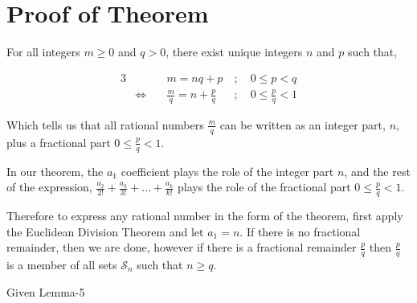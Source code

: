 \documentclass{article}
\begin{document}
\section*{Proof of Theorem}

For all integers \(m\ge{}0\) and \(q>0\),
there exist unique integers \(n\) and \(p\) such that,

{\normalsize
\bgroup                                  %
\setlength{\abovedisplayskip}{0pt}       %
\begin{alignat*}{3}
&&m = nq + p\ &;\quad 0\le{}p<q \\
&\Leftrightarrow\quad &\frac{m}{q} = n + \frac{p}{q}\ &;\quad 0\le{}\frac{p}{q}<1
\end{alignat*}
\egroup
}

Which tells us that all rational numbers \(\frac{m}{q}\) can be written as
an integer part, \(n\), plus a fractional part \(0\le{}\frac{p}{q}<1\).

In our theorem, the \(a_1\) coefficient plays the role of the integer part \(n\),
and the rest of the expression, \(\frac{a_2}{2!} + \frac{a_3}{3!} + \dots{} + \frac{a_k}{k!}\)
plays the role of the fractional part \(0\le{}\frac{p}{q}<1\).

Therefore to express any rational number in the form of the theorem, first apply the
Euclidean Division Theorem and let \(a_1 = n\). If there is no fractional remainder, then
we are done, however if there is a fractional remainder \(\frac{p}{q}\) 
then \(\frac{p}{q}\) is a member of all sets \(\mathcal{S}_n\)
such that \(n \ge{} q\).



Given Lemma-5 
\end{document}

